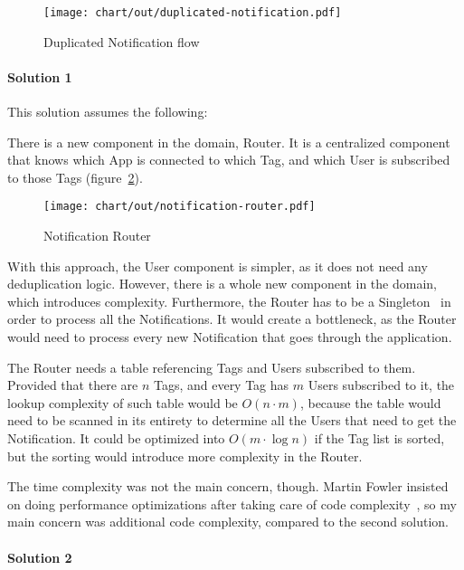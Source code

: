 \begin{figure}[h]
  \centering
  \texttt{[image: chart/out/duplicated-notification.pdf]}
  \caption{Duplicated Notification flow}
  \label{fig:duplicated-notification}
\end{figure}

\paragraph*{Solution 1}\label{par:duplication-solution-1}

This solution assumes the following:

There is a new component in the domain, Router.
It is a centralized component
that knows which App is connected to which Tag,
and which User is subscribed to those Tags
(figure~\ref{fig:notification-router}).

\begin{figure}[h]
  \centering
  \texttt{[image: chart/out/notification-router.pdf]}
  \caption{Notification Router}
  \label{fig:notification-router}
\end{figure}

With this approach,
the User component is simpler,
as it does not need any deduplication logic.
However, there is a whole new component
in the domain, which introduces complexity.
Furthermore, the Router has to be
a Singleton~\cite{gamma_design_1994}
in order to process all the Notifications.
It would create a bottleneck,
as the Router would need to process every new Notification
that goes through the application.

The Router needs a table referencing
Tags and Users subscribed to them.
Provided that there are $n$ Tags,
and every Tag has $m$ Users subscribed to it,
the lookup complexity of such table
would be $O(n \cdot m)$,
because the table would need to be
scanned in its entirety to determine
all the Users that need to get the Notification.
It could be optimized into $O(m \cdot \log n)$
if the Tag list is sorted,
but the sorting would introduce
more complexity in the Router.

The time complexity was not the main concern, though.
Martin Fowler insisted on doing performance optimizations
after taking care of code complexity~\cite{fowler_refactoring_2019},
so my main concern was additional code complexity,
compared to the second solution.

\paragraph*{Solution 2}\label{par:duplication-solution-2}

